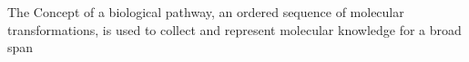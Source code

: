 \documentclass{article}
\begin{document}
\parbox{3cm}{The Concept of a biological pathway,
an ordered sequence of molecular transformations,
is used to collect and represent molecular knowledge
for a broad span}
\end{document}
